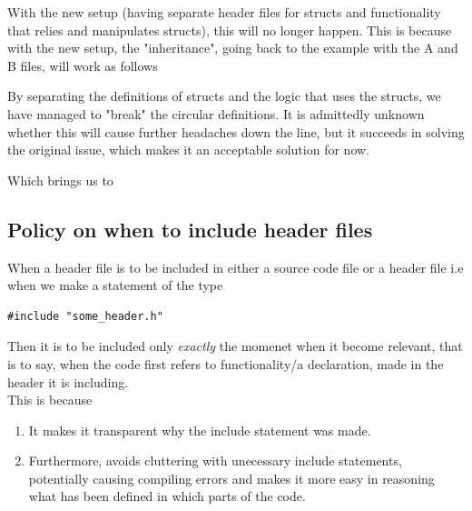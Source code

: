 \documentclass{report}
\begin{document}
With the new setup (having separate header files for structs and functionality that relies and manipulates structs), this will no longer happen. This is because with the new setup, the "inheritance", going back to the example with the A and B files, will work as follows
\begin{center}
\end{center}

By separating the definitions of structs and the logic that uses the structs, we have managed to "break" the circular definitions. It is admittedly unknown whether this will cause further headaches down the line, but it succeeds in solving the original issue, which makes it an acceptable solution for now. 

Which brings us to 
\begin{center}
\end{center}

\subsection{Policy on when to include header files}
When a header file is to be included in either a source code file or a header file i.e when we make a statement of the type
\begin{lstlisting}
#include "some_header.h"
\end{lstlisting}
Then it is to be included only \textit{exactly} the momenet when it become relevant, that is to say, when the code first refers to functionality/a declaration, made in the header it is including.  \\

This is because 
\begin{enumerate}
\item It makes it transparent why the include statement was made.
\item Furthermore, avoids cluttering with unecessary include statements, potentially causing compiling errors and makes it more easy in reasoning what has been defined in which parts of the code.
\end{enumerate}
\end{document}
